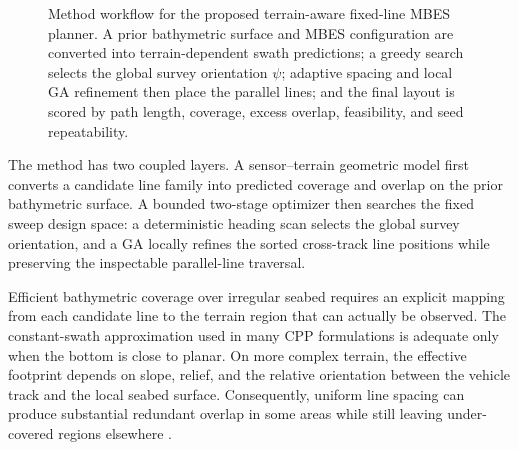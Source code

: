 \documentclass[jmse,article,submit,moreauthors]{Definitions/mdpi}
\begin{document}
\begin{figure}[!htbp]
{}
	\fi
	\caption{Method workflow for the proposed terrain-aware fixed-line MBES planner. A prior bathymetric surface and MBES configuration are converted into terrain-dependent swath predictions; a greedy search selects the global survey orientation \(\psi\); adaptive spacing and local GA refinement then place the parallel lines; and the final layout is scored by path length, coverage, excess overlap, feasibility, and seed repeatability.}
	\label{fig:method_pipeline}
\end{figure}

The method has two coupled layers. A sensor--terrain geometric model first converts a candidate line family into predicted coverage and overlap on the prior bathymetric surface. A bounded two-stage optimizer then searches the fixed sweep design space: a deterministic heading scan selects the global survey orientation, and a GA locally refines the sorted cross-track line positions while preserving the inspectable parallel-line traversal.

Efficient bathymetric coverage over irregular seabed requires an explicit mapping from each candidate line to the terrain region that can actually be observed. The constant-swath approximation used in many CPP formulations is adequate only when the bottom is close to planar. On more complex terrain, the effective footprint depends on slope, relief, and the relative orientation between the vehicle track and the local seabed surface. Consequently, uniform line spacing can produce substantial redundant overlap in some areas while still leaving under-covered regions elsewhere \cite{shi2020data,yordanova2020coverage,li2024multi}.
\end{document}

